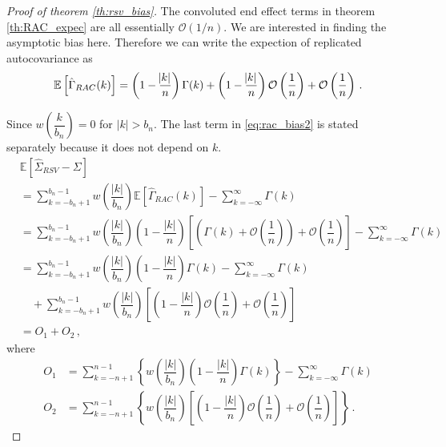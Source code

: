 \documentclass[12pt]{article}
\theoremstyle{remark}
\begin{document}
\begin{proof}[Proof of theorem \ref{th:rsv_bias}]
The convoluted end effect terms in theorem \ref{th:RAC_expec} are all essentially $\mathcal{O}(1/n)$. We are interested in finding the asymptotic bias here. Therefore we can write the expection of replicated autocovariance as 
\begin{equation} \label{eq:rac_bias2}
\mathbb{E} \left[\hat{\Gamma}_{RAC}(k) \right] = \left(1 - \dfrac{\abs{k}}{n}\right)\Gamma(k) + \left(1 - \dfrac{\abs{k}}{n}\right)\mathcal{O}\left(\dfrac{1}{n}\right) + \mathcal{O}\left(\dfrac{1}{n}\right)    \,.
\end{equation}

Since $w\left(\dfrac{k}{b_n}\right) = 0$ for $|k| > b_n$. 
The last term in \eqref{eq:rac_bias2} is stated separately because it does not depend on $k$. 
\begin{align*}
    &\mathbb{E} \left[\hat{\Sigma}_{RSV} - \Sigma \right]\\
    &= \sum_{k=-b_n+1}^{b_n-1} w\left(\dfrac{|k|}{b_n}\right)\mathbb{E} \left[\hat{\Gamma}_{RAC}(k) \right] - \sum_{k=-\infty}^{\infty}\Gamma(k)\\
    &= \sum_{k=-b_n+1}^{b_n-1}  w\left(\dfrac{|k|}{b_n}\right)\left(1-\dfrac{|k|}{n}\right)\left[\left(\Gamma(k) + \mathcal{O}\left(\dfrac{1}{n}\right)\right) + \mathcal{O}\left(\dfrac{1}{n}\right)\right]  - \sum_{k=-\infty}^{\infty}\Gamma(k)\\
    &= \sum_{k=-b_n+1}^{b_n-1} w\left(\dfrac{|k|}{b_n}\right)\left(1-\dfrac{|k|}{n}\right)\Gamma(k)  - \sum_{k=-\infty}^{\infty}\Gamma(k)\\
    & \quad + \sum_{k=-b_n+1}^{b_n-1}  w\left(\dfrac{|k|}{b_n}\right)\left[\left(1-\dfrac{|k|}{n}\right)\mathcal{O}\left(\dfrac{1}{n}\right) + \mathcal{O}\left(\dfrac{1}{n}\right)\right] \\ 
    & = O_1 + O_2\,,
\end{align*}
%
where 
\begin{align*}
O_1 & = \sum\limits_{k=-n+1}^{n-1}\left\{w\left(\dfrac{|k|}{b_n}\right)\left(1-\dfrac{|k|}{n}\right)\Gamma(k) \right\} - \sum\limits_{k=-\infty}^{\infty}\Gamma(k) \\ 
O_2 &= \sum\limits_{k=-n+1}^{n-1}\left\{w\left(\dfrac{|k|}{b_n}\right)\left[\left(1-\dfrac{|k|}{n}\right)\mathcal{O}\left(\dfrac{1}{n}\right) + \mathcal{O}\left(\dfrac{1}{n}\right)\right] \right\}\,.
\end{align*}


\end{proof}
\end{document}
